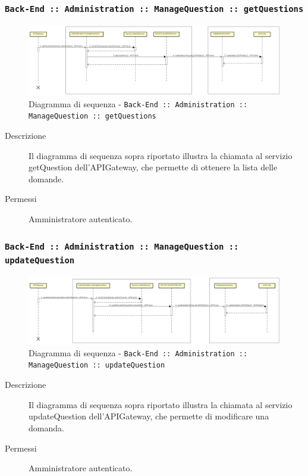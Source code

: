 \documentclass[../DefinizioneDiProdotto.tex]{subfiles}
\begin{document}
		\newpage
		\subsubsection{\texttt{Back-End :: Administration :: ManageQuestion :: getQuestions}}
		\begin{figure}[!h]
			\centering
			\includegraphics[width=\textwidth]{DiagrammiSequenza/Back-End/manageQuestion/getQuestion.png}
			\caption{Diagramma di sequenza - \texttt{Back-End :: Administration :: ManageQuestion :: getQuestions }}
		\end{figure}
		\begin{description}
			\item [Descrizione] Il diagramma di sequenza sopra riportato illustra la chiamata al servizio getQuestion dell'APIGateway, che permette di ottenere la lista delle domande.
			\item [Permessi] Amministratore autenticato.
		\end{description}

		\subsubsection{\texttt{Back-End :: Administration :: ManageQuestion :: updateQuestion}}
		\begin{figure}[!h]
			\centering
			\includegraphics[width=\textwidth]{DiagrammiSequenza/Back-End/manageQuestion/updateQuestion.png}
			\caption{Diagramma di sequenza - \texttt{Back-End :: Administration :: ManageQuestion :: updateQuestion} }
		\end{figure}
		\begin{description}
			\item [Descrizione] Il diagramma di sequenza sopra riportato illustra la chiamata al servizio updateQuestion dell'APIGateway, che permette di modificare una domanda.
			\item [Permessi] Amministratore autenticato.
		\end{description}
\end{document}
